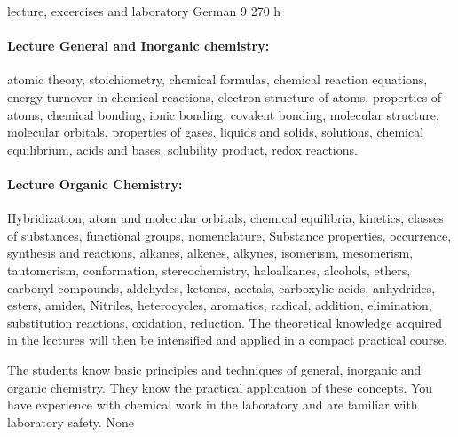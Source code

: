 {lecture, excercises and laboratory}
{German}
{9}
{270 h}
{\paragraph{Lecture General and Inorganic chemistry:} atomic theory, stoichiometry, chemical formulas, chemical reaction equations, energy turnover in chemical reactions, electron structure of atoms, properties of atoms, chemical bonding, ionic bonding, covalent bonding, molecular structure, molecular orbitals, properties of gases, liquids and solids, solutions, chemical equilibrium, acids and bases, solubility product, redox reactions.
\paragraph{Lecture Organic Chemistry: } Hybridization, atom and molecular orbitals, chemical equilibria, kinetics, classes of substances, functional groups, nomenclature, Substance properties, occurrence, synthesis and reactions, alkanes, alkenes, alkynes, isomerism, mesomerism, tautomerism, conformation, stereochemistry, haloalkanes, alcohols, ethers, carbonyl compounds, aldehydes, ketones, acetals, carboxylic acids, anhydrides, esters, amides, Nitriles, heterocycles, aromatics, radical, addition, elimination, substitution reactions, oxidation, reduction. The theoretical knowledge acquired in the lectures will then be intensified and applied in a compact practical course.}
{The students know basic principles and techniques of general, inorganic and organic chemistry. They know the practical application of these concepts. You have experience with chemical work in the laboratory and are familiar with laboratory safety.}
{None}